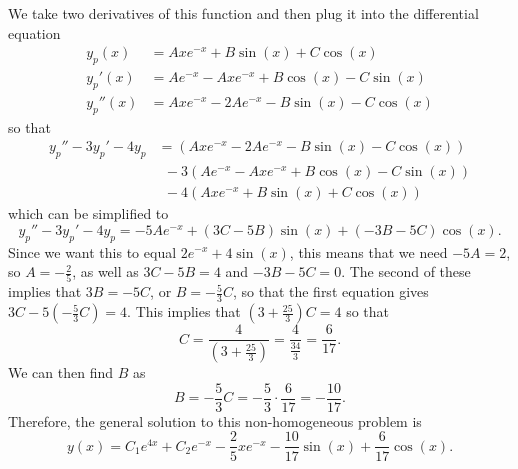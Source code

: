 \documentclass{ximera}
\begin{document}
\begin{exampleSol}
    We take two derivatives of this function and then plug it into the differential equation
    \begin{equation*}
        \begin{split}
            y_p(x) &= Axe^{-x} + B\sin(x) + C\cos(x) \\
            y_p'(x) &= Ae^{-x} - Axe^{-x} + B\cos(x) - C\sin(x) \\
            y_p''(x) &= Axe^{-x} - 2Ae^{-x} - B\sin(x) - C\cos(x)
        \end{split}
    \end{equation*}
    so that 
    \begin{equation*}
        \begin{split}
            y_p'' - 3y_p' - 4y_p &= (Axe^{-x} - 2Ae^{-x} - B\sin(x) - C\cos(x))\\
            &\ \ - 3(Ae^{-x} - Axe^{-x} + B\cos(x) - C\sin(x))\\
            & \ \  - 4(Axe^{-x} + B\sin(x) + C\cos(x))
        \end{split}
    \end{equation*}
    which can be simplified to
    \begin{equation*}
        y_p'' - 3y_p' - 4y_p = -5Ae^{-x} + (3C - 5B)\sin(x) + (-3B-5C)\cos(x).
    \end{equation*}
    Since we want this to equal $2e^{-x} + 4\sin(x)$, this means that we need $-5A = 2$, so $A = -\frac{2}{5}$, as well as $3C - 5B = 4$ and $-3B-5C = 0$. The second of these implies that $3B = -5C$, or $B = -\frac{5}{3}C$, so that the first equation gives $3C - 5(-\frac{5}{3}C) = 4$. This implies that $(3 + \frac{25}{3})C = 4$ so that \[ C = \frac{4}{(3 + \frac{25}{3})} = \frac{4}{\frac{34}{3}} = \frac{6}{17}.\] We can then find $B$ as
    \[ 
        B = -\frac{5}{3}C = -\frac{5}{3} \cdot \frac{6}{17} = -\frac{10}{17}.
    \] 
    Therefore, the general solution to this non-homogeneous problem is
    \begin{equation*}
        y(x) = C_1e^{4x} + C_2e^{-x} - \frac{2}{5}xe^{-x} - \frac{10}{17}\sin(x) + \frac{6}{17}\cos(x).
    \end{equation*}
    

\end{exampleSol}
\end{document}
